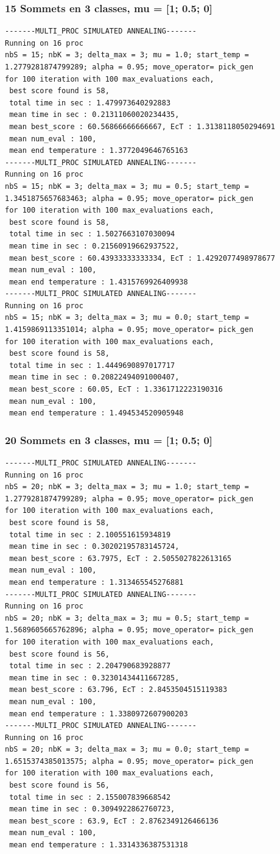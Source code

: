 \documentclass[a4paper]{article}
\begin{document}
\subsubsection{15 Sommets en 3 classes, mu = [1; 0.5; 0]}
\begin{verbatim}
-------MULTI_PROC SIMULATED ANNEALING-------
Running on 16 proc
nbS = 15; nbK = 3; delta_max = 3; mu = 1.0; start_temp = 1.2779281874799289; alpha = 0.95; move_operator= pick_gen
for 100 iteration with 100 max_evaluations each, 
 best score found is 58,
 total time in sec : 1.479973640292883
 mean time in sec : 0.21311060020234435,
 mean best_score : 60.56866666666667, EcT : 1.3138118050294691
 mean num_eval : 100,
 mean end temperature : 1.3772049646765163
-------MULTI_PROC SIMULATED ANNEALING-------
Running on 16 proc
nbS = 15; nbK = 3; delta_max = 3; mu = 0.5; start_temp = 1.3451875657683463; alpha = 0.95; move_operator= pick_gen
for 100 iteration with 100 max_evaluations each, 
 best score found is 58,
 total time in sec : 1.5027663107030094
 mean time in sec : 0.21560919662937522,
 mean best_score : 60.43933333333334, EcT : 1.4292077498978677
 mean num_eval : 100,
 mean end temperature : 1.4315769926409938
-------MULTI_PROC SIMULATED ANNEALING-------
Running on 16 proc
nbS = 15; nbK = 3; delta_max = 3; mu = 0.0; start_temp = 1.4159869113351014; alpha = 0.95; move_operator= pick_gen
for 100 iteration with 100 max_evaluations each, 
 best score found is 58,
 total time in sec : 1.4449690897017717
 mean time in sec : 0.20822494091000407,
 mean best_score : 60.05, EcT : 1.3361712223190316
 mean num_eval : 100,
 mean end temperature : 1.494534520905948
\end{verbatim}
\subsubsection{20 Sommets en 3 classes, mu = [1; 0.5; 0]}
\begin{verbatim}
-------MULTI_PROC SIMULATED ANNEALING-------
Running on 16 proc
nbS = 20; nbK = 3; delta_max = 3; mu = 1.0; start_temp = 1.2779281874799289; alpha = 0.95; move_operator= pick_gen
for 100 iteration with 100 max_evaluations each, 
 best score found is 58,
 total time in sec : 2.100551615934819
 mean time in sec : 0.30202195783145724,
 mean best_score : 63.7975, EcT : 2.5055027822613165
 mean num_eval : 100,
 mean end temperature : 1.313465545276881
-------MULTI_PROC SIMULATED ANNEALING-------
Running on 16 proc
nbS = 20; nbK = 3; delta_max = 3; mu = 0.5; start_temp = 1.5689605665762896; alpha = 0.95; move_operator= pick_gen
for 100 iteration with 100 max_evaluations each, 
 best score found is 56,
 total time in sec : 2.204790683928877
 mean time in sec : 0.32301434411667285,
 mean best_score : 63.796, EcT : 2.8453504515119383
 mean num_eval : 100,
 mean end temperature : 1.3380972607900203
-------MULTI_PROC SIMULATED ANNEALING-------
Running on 16 proc
nbS = 20; nbK = 3; delta_max = 3; mu = 0.0; start_temp = 1.6515374385013575; alpha = 0.95; move_operator= pick_gen
for 100 iteration with 100 max_evaluations each, 
 best score found is 56,
 total time in sec : 2.155007839668542
 mean time in sec : 0.3094922862760723,
 mean best_score : 63.9, EcT : 2.8762349126466136
 mean num_eval : 100,
 mean end temperature : 1.3314336387531318
\end{verbatim}
\end{document}

